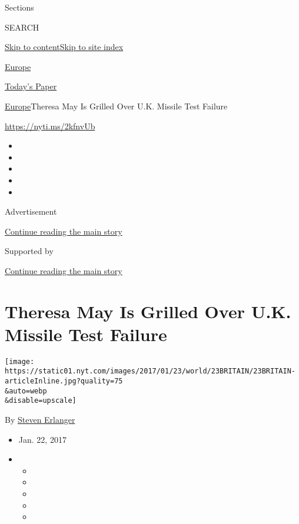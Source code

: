 Sections

SEARCH

\protect\hyperlink{site-content}{Skip to
content}\protect\hyperlink{site-index}{Skip to site index}

\href{https://www.nytimes.com/section/world/europe}{Europe}

\href{https://myaccount.nytimes.com/auth/login?response_type=cookie\&client_id=vi}{}

\href{https://www.nytimes.com/section/todayspaper}{Today's Paper}

\href{/section/world/europe}{Europe}\textbar{}Theresa May Is Grilled
Over U.K. Missile Test Failure

\url{https://nyti.ms/2kfnvUb}

\begin{itemize}
\item
\item
\item
\item
\item
\end{itemize}

Advertisement

\protect\hyperlink{after-top}{Continue reading the main story}

Supported by

\protect\hyperlink{after-sponsor}{Continue reading the main story}

\hypertarget{theresa-may-is-grilled-over-uk-missile-test-failure}{%
\section{Theresa May Is Grilled Over U.K. Missile Test
Failure}\label{theresa-may-is-grilled-over-uk-missile-test-failure}}

\texttt{[image: https://static01.nyt.com/images/2017/01/23/world/23BRITAIN/23BRITAIN-articleInline.jpg?quality=75\\\&auto=webp\\\&disable=upscale]}

By \href{http://www.nytimes.com/by/steven-erlanger}{Steven Erlanger}

\begin{itemize}
\item
  Jan. 22, 2017
\item
  \begin{itemize}
  \item
  \item
  \item
  \item
  \item
  \end{itemize}
\end{itemize}

